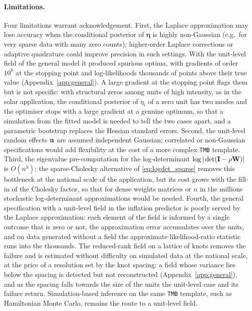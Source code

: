 \paragraph{Limitations.}
Four limitations warrant acknowledgement.
First, the Laplace approximation may lose accuracy when the conditional posterior of $\boldsymbol{\eta}$ is highly non-Gaussian (e.g.\ for very sparse data with many zero counts); higher-order Laplace corrections or adaptive quadrature could improve precision in such settings.
With the unit-level field of the general model it produced spurious optima, with gradients of order $10^8$ at the stopping point and log-likelihoods thousands of points above their true value (Appendix~\ref{app:general}).
A large gradient at the stopping point flags them but is not specific: with structural zeros among units of high intensity, as in the solar application, the conditional posterior of $\eta_i$ of a zero unit has two modes and the optimiser stops with a large gradient at a genuine optimum, so that a simulation from the fitted model is needed to tell the two cases apart, and a parametric bootstrap replaces the Hessian standard errors.
Second, the unit-level random effects $\mathbf{u}$ are assumed independent Gaussian; correlated or non-Gaussian specifications would add flexibility at the cost of a more complex \texttt{TMB} template.
Third, the eigenvalue pre-computation for the log-determinant $\log|\det(\mathbf{I}-\rho\mathbf{W})|$ is $O(n^3)$; the sparse-Cholesky alternative of \eqref{eq:logdet_sparse} removes this bottleneck at the national scale of the application, but its cost grows with the fill-in of the Cholesky factor, so that for dense weights matrices or $n$ in the millions stochastic log-determinant approximations \citep[e.g.][]{barry_pace1999} would be needed.
Fourth, the general specification with a unit-level field in the inflation predictor is poorly served by the Laplace approximation: each element of the field is informed by a single outcome that is zero or not, the approximation error accumulates over the units, and on data generated without a field the approximate likelihood-ratio statistic runs into the thousands.
The reduced-rank field on a lattice of knots removes the failure and is estimated without difficulty on simulated data at the national scale, at the price of a resolution set by the knot spacing: a field whose variance lies below the spacing is detected but not reconstructed (Appendix~\ref{app:general}), and as the spacing falls towards the size of the units the unit-level case and its failure return.
Simulation-based inference on the same \texttt{TMB} template, such as Hamiltonian Monte Carlo, remains the route to a unit-level field.

